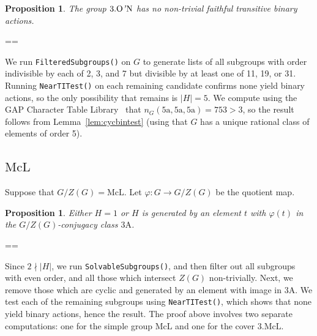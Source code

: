 \documentclass[11pt, a4paper]{amsart}
\makeatletter
\newtheorem{prop}[thm]{Proposition}
\newcommand\rk{\noindent{\sc Remark.} }
\renewcommand{\proofname}{Proof}
\renewenvironment{proof}[1][\proofname]{\par
  \pushQED{\qed}  \normalfont \partopsep=\z@skip \topsep=\z@skip
  \trivlist
  \item[\hskip\labelsep
        \scshape
    #1\@addpunct{.}]\ignorespaces
}{  \popQED\endtrivlist\@endpefalse
}
\makeatother
\begin{document}
\begin{prop}
    The group $3.\mathrm{O\text{\emph{'}}N}$ has no non-trivial faithful transitive binary actions.
\end{prop}
\begin{proof}
    We run {\tt FilteredSubgroups()} on $G$ to generate lists of all subgroups with order indivisible by each of 2, 3, and 7 but divisible by at least one of 11, 19, or 31. Running {\tt NearTITest()} on each remaining candidate confirms none yield binary actions, so the only possibility that remains is $|H|=5$. We compute using the {\sf GAP} Character Table Library~\cite{CTblLib1.3.11} that $n_G(\mathrm{5a,5a,5a})=753>3$, so the result follows from Lemma~\ref{lem:cycbintest} (using that $G$ has a unique rational class of elements of order 5).
\end{proof}
\subsection{$\mathrm{McL}$}
Suppose that $G/Z(G)=\mathrm{McL}$.
  Let $\varphi:G\to G/Z(G)$ be the quotient map.
\begin{prop}\label{prop:McLclass}
    Either $H=1$ or $H$ is generated by an element $t$ with $\varphi(t)$ in the $G/Z(G)$-conjugacy class $\mathrm{3A}$.
\end{prop}

\begin{proof}
    Since $2\nmid |H|$, we run {\tt SolvableSubgroups()}, and then filter out all subgroups with even order, and all those which intersect $Z(G)$ non-trivially. Next, we remove those which are cyclic and generated by an element with image in $\mathrm{3A}$. We test each of the remaining subgroups using {\tt NearTITest()}, which shows that none yield binary actions, hence the result.
\end{proof}
\rk{The proof above involves two separate computations: one for the simple group $\mathrm{McL}$ and one for the cover $3.\mathrm{McL}$.}
\end{document}

